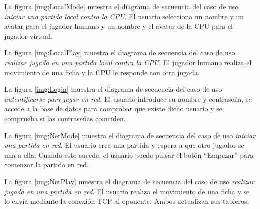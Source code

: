 La figura \ref{img:LocalMode} muestra el diagrama de secuencia del caso de uso
\emph{iniciar una partida local contra la CPU}. El usuario selecciona
un nombre y un avatar para el jugador humano y un nombre y el avatar de la CPU
para el jugador virtual.


La figura \ref{img:LocalPlay} muestra el diagrama de secuencia del caso de uso
\emph{realizar jugada en una partida local contra la CPU}. El jugador humano 
realiza el movimiento de una ficha y la CPU le responde con otra jugada.

\begin{sidewaysfigure}
\end{sidewaysfigure}

La figura \ref{img:Login} muestra el diagrama de secuencia del caso de uso
\emph{autentificarse para jugar en red}. El usuario introduce su nombre y
contraseña, se accede a la base de datos para comprobar que existe dicho
usuario y se comprueba si las contraseñas coinciden.

\begin{sidewaysfigure}
\end{sidewaysfigure}

La figura \ref{img:NetMode} muestra el diagrama de secuencia del caso de uso
\emph{iniciar una partida en red}. El usuario crea una partida y espera a que
otro jugador se una a ella. Cuando esto sucede, el usuario puede pulsar el
botón ``Empezar'' para comenzar la partida en red.

\begin{sidewaysfigure}
\end{sidewaysfigure}

La figura \ref{img:NetPlay} muestra el diagrama de secuencia del caso de uso
\emph{realizar jugada en una partida en red}. El usuario realiza el movimiento
de una ficha y se lo envía mediante la conexión TCP al oponente. Ambos
actualizan sus tableros.

\begin{sidewaysfigure}
\end{sidewaysfigure}



